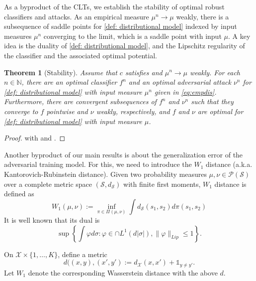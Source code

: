 \documentclass{amsart}
\theoremstyle{plain}
\numberwithin{equation}{section}\newtheorem{theorem}{Theorem}[section]
\theoremstyle{remark}
\begin{document}
As a byproduct of the CLTs, we establish the stability of optimal robust classifiers and attacks. As an empirical measure $\mu^n \to \mu$ weakly, there is a subsequence of saddle points for \eqref{def: distributional model} indexed by input measures $\mu^n$ converging to the limit, which is a saddle point with input $\mu$. A key idea is the duality of \eqref{def: distributional model}, and the Lipschitz regularity of the classifier and the associated optimal potential.






    
\begin{theorem}[Stability]\label{thm: convergence}
Assume that $c$ satisfies  and $\mu^n \to \mu$ weakly. For each $n \in \mathbb{N}$, there are an optimal classifier $f^n$ and an optimal adversarial attack $\nu^n$ for \eqref{def: distributional model} with input measure $\mu^n$ given in \eqref{eq:empdis}. Furthermore, there are convergent subsequences of $f^n$ and $\nu^n$ such that they converge to $f$ pointwise and $\nu$ weakly, respectively, and $f$ and $\nu$ are optimal for \eqref{def: distributional model} with input measure $\mu$. 
\end{theorem}


\begin{proof}
 with  and .    
\end{proof}



Another byproduct of our main results is about the generalization error of the adversarial training model. For this, we need to introduce the $W_1$ distance (a.k.a. Kantorovich-Rubinstein distance). Given two probability measures $\mu, \nu \in \mathcal{P}(\mathcal{S})$ over a complete metric space $(\mathcal{S}, d_\mathcal{S})$ with finite first moments, $W_1$ distance is defined as
\[
    W_1(\mu,\nu) := \inf_{\pi \in \Pi(\mu, \nu)} \int d_\mathcal{S}(s_1, s_2) d\pi(s_1, s_2)
\]
It is well known that its dual is
\[
    \sup \left\{ \int \varphi d\sigma : \varphi \in \cap L^1(d |\sigma|), \| \varphi \|_{Lip} \leq 1 \right\}.
\]


On $\mathcal{X} \times \{1, \dots, K\}$, define a metric
\[
    d( (x,y), (x',y'):= d_\mathcal{X}(x,x') + \mathds{1}_{y \neq y'}.
\]
Let $W_{1}$ denote the
corresponding Wasserstein distance with the above $d$.
\end{document}
